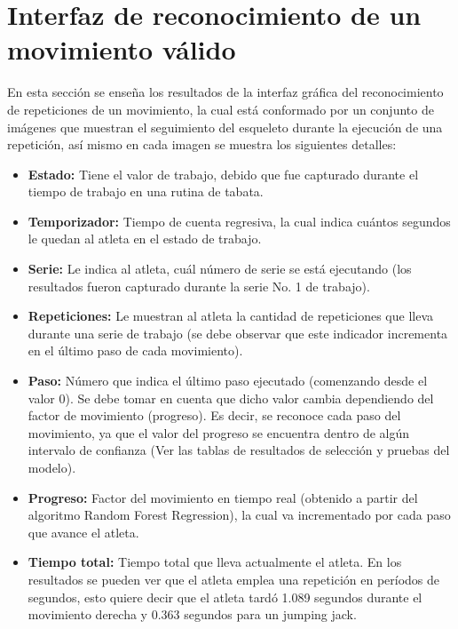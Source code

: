 \section{Interfaz de reconocimiento de un  movimiento v\'alido}
En esta secci\'on se ense\~na los resultados de la interfaz gr\'afica del reconocimiento de repeticiones de un movimiento, la cual est\'a conformado por un conjunto de im\'agenes que muestran el seguimiento del esqueleto durante la ejecuci\'on de una repetici\'on, as\'i mismo en cada imagen se muestra los siguientes detalles:
\begin{itemize}
\item \textbf{Estado:} Tiene el valor de trabajo, debido que fue capturado durante el tiempo de trabajo en una rutina de tabata.
\item \textbf{Temporizador:} Tiempo de cuenta regresiva, la cual indica cu\'antos segundos le quedan al atleta en el estado de trabajo.
\item \textbf{Serie:} Le indica al atleta, cu\'al n\'umero de serie se est\'a ejecutando (los resultados fueron capturado durante la serie No. 1 de trabajo).
\item \textbf{Repeticiones:} Le muestran al atleta la cantidad de repeticiones que lleva durante una   serie de trabajo (se debe observar que este indicador incrementa en el \'ultimo paso de cada movimiento).
\item \textbf{Paso:} N\'umero que indica el \'ultimo paso ejecutado (comenzando desde el valor 0). Se debe tomar en cuenta que dicho valor cambia dependiendo del factor de movimiento (progreso). Es decir, se  reconoce cada paso del movimiento, ya que el valor del progreso se encuentra dentro de alg\'un intervalo de confianza (Ver las tablas de resultados de selecci\'on y pruebas del modelo).
\item \textbf{Progreso:} Factor del movimiento en tiempo real (obtenido a partir del algoritmo Random Forest Regression), la cual va incrementado por cada paso que avance el atleta.
\item \textbf{Tiempo total:} Tiempo total que lleva actualmente el atleta. En los resultados se pueden ver que el atleta emplea una repetici\'on en per\'iodos de segundos, esto quiere decir que el atleta tard\'o 1.089 segundos durante el movimiento derecha y  0.363 segundos para un jumping jack.
\end{itemize}
